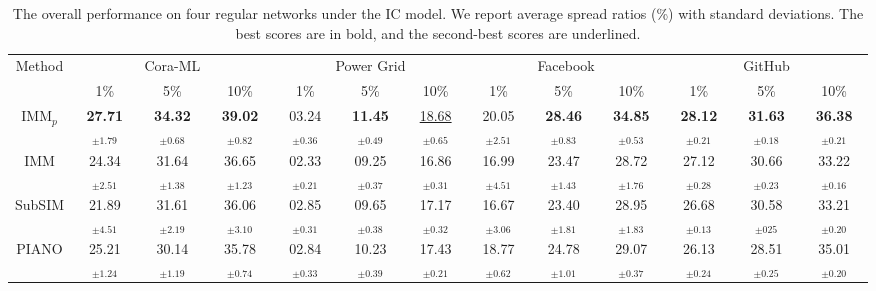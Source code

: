 \begin{table*}[!ht]
\begin{center}
\centering
\caption{The overall performance on four regular networks under the IC model. We report average spread ratios (\%) with standard deviations. The best scores are in bold, and the second-best scores are underlined.}
\resizebox{\textwidth}{!} {
\begin{tabular}{c ccc ccc ccc ccc } 
\toprule
\multirow{2}{*}{Method} 
        & \multicolumn{3}{c}{Cora-ML} 
        & \multicolumn{3}{c}{Power Grid} 
        & \multicolumn{3}{c}{Facebook}
        & \multicolumn{3}{c}{GitHub} \\ 
        \cmidrule{2-13}

    & 1\% & 5\% & 10\% 
    & 1\% & 5\% & 10\%
    & 1\% & 5\% & 10\%
    & 1\% & 5\% & 10\%  \\
\midrule  

IMM$_{p}$
    & \textbf{27.71}$_{\pm1.79}$ & \textbf{34.32}$_{\pm0.68}$ & \textbf{39.02}$_{\pm0.82}$ 
    & 03.24$_{\pm0.36}$ & \textbf{11.45}$_{\pm0.49}$ & \underline{18.68}$_{\pm0.65}$ 
    & 20.05$_{\pm2.51}$ & \textbf{28.46}$_{\pm0.83}$ & \textbf{34.85}$_{\pm0.53}$ 
    & \textbf{28.12}$_{\pm0.21}$ & \textbf{31.63}$_{\pm0.18}$ & \textbf{36.38}$_{\pm0.21}$\\

\midrule  

IMM
    & 24.34$_{\pm2.51}$ & 31.64$_{\pm1.38}$ & 36.65$_{\pm1.23}$
    & 02.33$_{\pm0.21}$ & 09.25$_{\pm0.37}$ & 16.86$_{\pm0.31}$ 
    & 16.99$_{\pm4.51}$ & 23.47$_{\pm1.43}$ & 28.72$_{\pm1.76}$ 
    & 27.12$_{\pm0.28}$ & 30.66$_{\pm0.23}$ & 33.22$_{\pm0.16}$ \\

SubSIM
    & 21.89$_{\pm4.51}$ & 31.61$_{\pm2.19}$ & 36.06$_{\pm3.10}$ 
    & 02.85$_{\pm0.31}$ & 09.65$_{\pm0.38}$ & 17.17$_{\pm0.32}$ 
    & 16.67$_{\pm3.06}$ & 23.40$_{\pm1.81}$ & 28.95$_{\pm1.83}$ 
    & 26.68$_{\pm0.13}$ & 30.58$_{\pm025}$ & 33.21$_{\pm0.20}$ \\

\midrule

PIANO
    & 25.21$_{\pm1.24}$ & 30.14$_{\pm1.19}$ & 35.78$_{\pm0.74}$ 
    & 02.84$_{\pm0.33}$ & 10.23$_{\pm0.39}$ & 17.43$_{\pm0.21}$ 
    & 18.77$_{\pm0.62}$ & 24.78$_{\pm1.01}$ & 29.07$_{\pm0.37}$ 
    & 26.13$_{\pm0.24}$ & 28.51$_{\pm0.25}$ & 35.01$_{\pm0.20}$ \\
    

\end{tabular}}
\end{center}
\end{table*}

